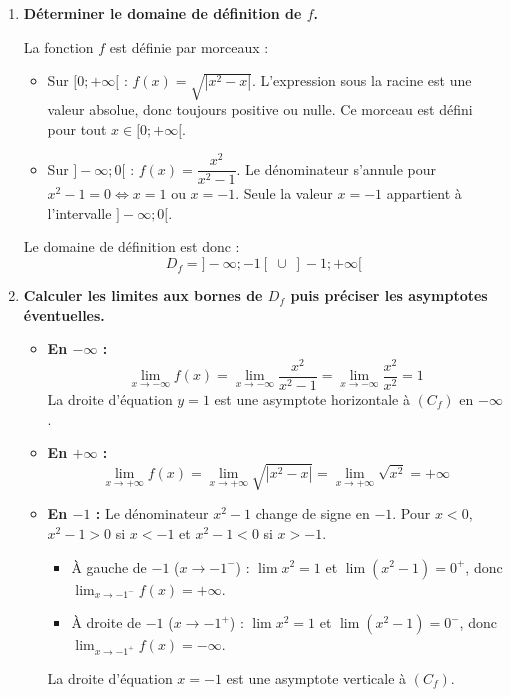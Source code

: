 \documentclass[12pt,a4paper]{article}
\begin{document}
\begin{enumerate}
    \item \textbf{Déterminer le domaine de définition de $f$.}
    
    La fonction $f$ est définie par morceaux :
    \begin{itemize}
        \item Sur $[0; +\infty[$ : $f(x) = \sqrt{|x^2-x|}$. L'expression sous la racine est une valeur absolue, donc toujours positive ou nulle. Ce morceau est défini pour tout $x \in [0; +\infty[$.
        \item Sur $]-\infty; 0[$ : $f(x) = \dfrac{x^2}{x^2-1}$. Le dénominateur s'annule pour $x^2 - 1 = 0 \iff x = 1$ ou $x = -1$. Seule la valeur $x = -1$ appartient à l'intervalle $]-\infty; 0[$.
    \end{itemize}
    Le domaine de définition est donc :
    \[ D_f = ]-\infty; -1[ \;\cup\; ]-1; +\infty[ \]

    \item \textbf{Calculer les limites aux bornes de $D_{f}$ puis préciser les asymptotes éventuelles.}
    
    \begin{itemize}
        \item \textbf{En $-\infty$ :} 
        \[ \lim_{x \to -\infty} f(x) = \lim_{x \to -\infty} \frac{x^2}{x^2-1} = \lim_{x \to -\infty} \frac{x^2}{x^2} = 1 \]
        La droite d'équation \textbf{$y = 1$} est une asymptote horizontale à $(C_f)$ en $-\infty$.
        
        \item \textbf{En $+\infty$ :} 
        \[ \lim_{x \to +\infty} f(x) = \lim_{x \to +\infty} \sqrt{|x^2-x|} = \lim_{x \to +\infty} \sqrt{x^2} = +\infty \]
        
        \item \textbf{En $-1$ :} Le dénominateur $x^2-1$ change de signe en $-1$. Pour $x < 0$, $x^2-1 > 0$ si $x < -1$ et $x^2-1 < 0$ si $x > -1$.
        \begin{itemize}
            \item À gauche de $-1$ ($x \to -1^-$) : $\lim x^2 = 1$ et $\lim (x^2-1) = 0^+$, donc $\lim_{x \to -1^-} f(x) = +\infty$.
            \item À droite de $-1$ ($x \to -1^+$) : $\lim x^2 = 1$ et $\lim (x^2-1) = 0^-$, donc $\lim_{x \to -1^+} f(x) = -\infty$.
        \end{itemize}
        La droite d'équation \textbf{$x = -1$} est une asymptote verticale à $(C_f)$.
    \end{itemize}


\end{enumerate}
\end{document}
